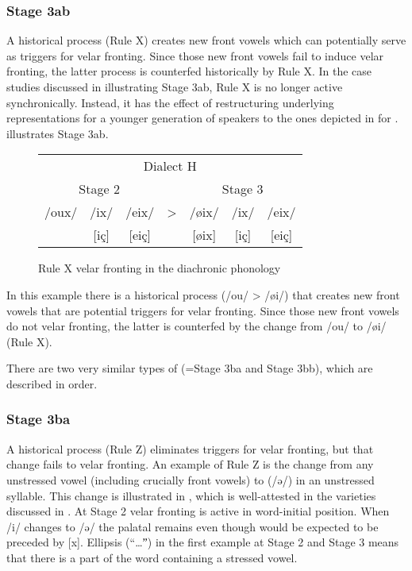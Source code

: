\begin{xlist}
\begin{xlist}
\subsubsection{Stage 3ab}
A historical process (Rule X) creates new front vowels which can potentially serve as triggers for velar fronting. Since those new front vowels fail to induce velar fronting, the latter process is counterfed historically by Rule X. In the case studies discussed in  illustrating Stage 3ab, Rule X is no longer active synchronically. Instead, it has the effect of restructuring underlying representations for a younger generation of speakers to the ones depicted in  for .  illustrates Stage 3ab.

\begin{figure}
\tabcolsep=3pt
\begin{tabular}{*{7}{c}}
                   \multicolumn{7}{c}{Dialect H}\\\cmidrule(lr){1-7}
 \multicolumn{3}{c}{Stage 2}   & &  \multicolumn{3}{c}{Stage 3}\\\cmidrule(lr){1-3}\cmidrule(lr){5-7}
      /oux/  &   /ix/  &   /eix/ &   >   &  /øix/  &  /ix/   &  /eix/\\\relax
      [oux]  &  [iç]   & [eiç]   &       &  [øix]  &  [iç]   &  [eiç]\\
\end{tabular}
\caption{\label{fig:2.10}Rule X  velar fronting in the diachronic phonology}
\end{figure}

In this example there is a historical process (/ou/ > /øi/) that creates new front vowels that are potential triggers for velar fronting. Since those new front vowels do not  velar fronting, the latter is counterfed by the change from /ou/ to /øi/ (Rule X).

There are two very similar types of  (=Stage 3ba and Stage 3bb), which are described in order.

\subsubsection{Stage 3ba}
\begin{sloppypar}
A historical process (Rule Z) eliminates triggers for velar fronting, but that change fails to  velar fronting. An example of Rule Z is the change from any unstressed vowel (including crucially front vowels) to  (/ə/) in an unstressed syllable. This change is illustrated in , which is well-attested in the varieties discussed in . At Stage 2 velar fronting is active in word-initial position. When /i/ changes to /ə/ the palatal remains even though  would be expected to be preceded by [x]. Ellipsis (“…ˮ) in the first example at Stage 2 and Stage 3 means that there is a part of the word containing a stressed vowel.
\end{sloppypar}


\end{xlist}
\end{xlist}

